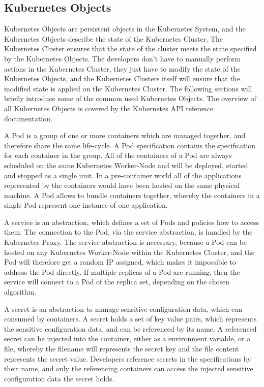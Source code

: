 \subsection{Kubernetes Objects}
\label{sec:caas-kubernetes-objects}
Kubernetes Objects are persistent objects in the Kubernetes System, and the Kubernetes Objects describe the state of the Kubernetes Cluster. The Kubernetes Cluster ensures that the state of the cluster meets the state specified by the Kubernetes Objects. The developers don't have to manually perform actions in the Kubernetes Cluster, they just have to modify the state of the Kubernetes Objects, and the Kubernetes Clusters itself will ensure that the modified state is applied on the Kubernetes Cluster. The following sections will briefly introduce some of the common used Kubernetes Objects. The overview of all Kubernetes Objects is covered by the Kubernetes API reference documentation\cite{CNCFKubernetesAPI2018}. 

A Pod is a group of one or more containers which are managed together, and therefore share the same life-cycle. A Pod specification contains the specification for each container in the group. All of the containers of a Pod are always scheduled on the same Kubernetes Worker-Node and will be deployed, started and stopped as a single unit. In a pre-container world all of the applications represented by the containers would have been hosted on the same physical machine. A Pod allows to bundle containers together, whereby the containers in a single Pod represent one instance of one application\cite{CNCFKubernetesPods2018}. 

A service is an abstraction, which defines a set of Pods and policies how to access them. The connection to the Pod, via the service abstraction, is handled by the Kubernetes Proxy. The service abstraction is necessary, because a Pod can be hosted on any Kubernetes Worker-Node within the Kubernetes Cluster, and the Pod will therefore get a random IP assigned, which makes it impossible to address the Pod directly. If multiple replicas of a Pod are running, then the service will connect to a Pod of the replica set, depending on the chosen algorithm\cite{CNCFKubernetesServices2018}.

A secret is an abstraction to manage sensitive configuration data, which can consumed by containers. A secret holds a set of key value pairs, which represents the sensitive configuration data, and can be referenced by its name. A referenced secret can be injected into the container, either as a environment variable, or a file, whereby the filename will represents the secret key and the file content represents the secret value. Developers reference secrets in the specifications by their name, and only the referencing containers can access the injected sensitive configuration data the secret holds\cite{CNCFKubernetesSecrets2018}. 

